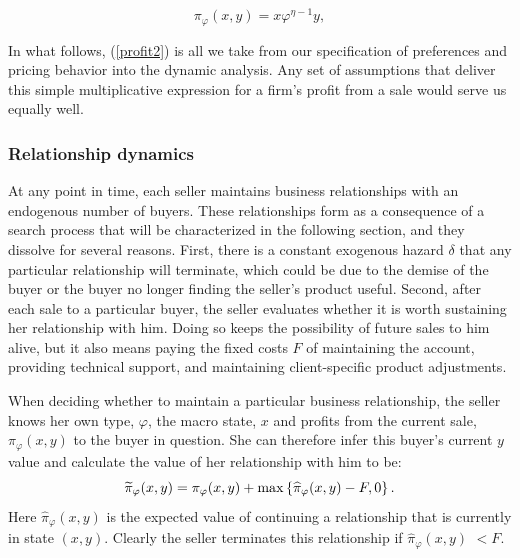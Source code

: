 \begin{equation}
\pi _{\varphi }(x,y)=x\varphi ^{\eta -1}y,  \label{profit2}
\end{equation}
\qquad \qquad

In what follows, (\ref{profit2}) is all we take from our specification of
preferences and pricing behavior into the dynamic analysis. Any set of
assumptions that deliver this simple multiplicative expression for a firm's
profit from a sale would serve us equally well.

\subsubsection{Relationship dynamics}

At any point in time, each seller maintains business relationships with an
endogenous number of buyers. These relationships form as a consequence of a
search process that will be characterized in the following section, and they
dissolve for several reasons. First, there is a constant exogenous hazard $%
\delta $ that any particular relationship will terminate, which could be due
to the demise of the buyer or the buyer no longer finding the seller's
product useful. Second, after each sale to a particular buyer, the seller
evaluates whether it is worth sustaining her relationship with him. Doing so
keeps the possibility of future sales to him alive, but it also means paying
the fixed costs $F$ of maintaining the account, providing technical support,
and maintaining client-specific product adjustments.\footnotemark{}

When deciding whether to maintain a particular business relationship, the
seller knows her own type, $\varphi $, the macro state, $x$ and profits from
the current sale, $\pi _{\varphi }(x,y)$ to the buyer in question. She can
therefore infer this buyer's current $y$ value and calculate the value of
her relationship with him to be:%
\begin{equation*}
\widetilde{\pi }_{\varphi }(x,y)=\pi _{\varphi }(x,y)+\max \left\{ \widehat{%
\pi }_{\varphi }(x,y)-F,0\right\} .
\end{equation*}%
Here $\widehat{\pi }_{\varphi }(x,y)$ is the expected value of continuing a
relationship that is currently in state $(x,y).$ Clearly the seller
terminates this relationship if $\widehat{\pi }_{\varphi }(x,y)$ $<F.$

